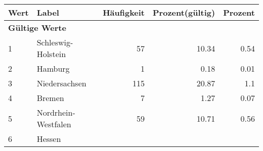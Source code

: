      \begin{longtable}{lXrrr}
     \toprule
     \textbf{Wert} & \textbf{Label} & \textbf{Häufigkeit} & \textbf{Prozent(gültig)} & \textbf{Prozent} \\
     \endhead
     \midrule
     \multicolumn{5}{l}{\textbf{Gültige Werte}}\\

     1 &
     \multicolumn{1}{X}{ Schleswig-Holstein   } &


       \num{57} &
       \num[round-mode=places,round-precision=2]{10.34} &
         \num[round-mode=places,round-precision=2]{0.54} \\

     2 &
     \multicolumn{1}{X}{ Hamburg   } &


       \num{1} &
       \num[round-mode=places,round-precision=2]{0.18} &
         \num[round-mode=places,round-precision=2]{0.01} \\

     3 &
     \multicolumn{1}{X}{ Niedersachsen   } &


       \num{115} &
       \num[round-mode=places,round-precision=2]{20.87} &
         \num[round-mode=places,round-precision=2]{1.1} \\

     4 &
     \multicolumn{1}{X}{ Bremen   } &


       \num{7} &
       \num[round-mode=places,round-precision=2]{1.27} &
         \num[round-mode=places,round-precision=2]{0.07} \\

     5 &
     \multicolumn{1}{X}{ Nordrhein-Westfalen   } &


       \num{59} &
       \num[round-mode=places,round-precision=2]{10.71} &
         \num[round-mode=places,round-precision=2]{0.56} \\

     6 &
     \multicolumn{1}{X}{ Hessen   } &



\end{longtable}
